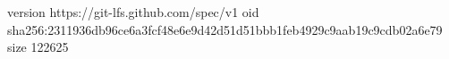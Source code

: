 version https://git-lfs.github.com/spec/v1
oid sha256:2311936db96ce6a3fcf48e6e9d42d51d51bbb1feb4929c9aab19c9cdb02a6e79
size 122625
